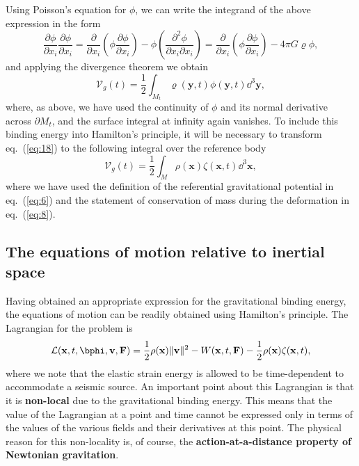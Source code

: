 Using Poisson's equation for $\phi$, we can write the integrand of the above expression in the form
\begin{equation}
\frac{\partial\phi}{\partial x_{i}}\frac{\partial\phi}{\partial x_{i}}=\frac{\partial}{\partial x_{i}}
\left(\phi\frac{\partial\phi}{\partial x_{i}}\right)-\phi\left(\frac{\partial^{2}\phi}{\partial x_{i}
\partial x_{i}}\right)=\frac{\partial}{\partial x_{i}}\left(\phi\frac{\partial\phi}{\partial x_{i}}\right)-4\pi G\varrho\phi,
\label{eq:17}
\end{equation}
and applying the divergence theorem we obtain
\begin{equation}
\mathcal{V}_{g}(t)=\frac{1}{2}\int_{M_{t}}\varrho(\mathbf{y},t)\phi(\mathbf{y},t)\dd^{3}\mathbf{y},
\label{eq:18}
\end{equation}
where, as above, we have used the continuity of $\phi$ and its normal derivative across $\partial M_{t}$, 
and the surface integral at infinity again vanishes. To include this binding energy into Hamilton's principle, 
it will be necessary to transform eq.~(\ref{eq:18}) to the following integral over the reference body
\begin{equation}
\mathcal{V}_{g}(t)=\frac{1}{2}\int_{M}\rho(\mathbf{x})\zeta(\mathbf{x},t)\dd^{3}\mathbf{x},
\label{eq:19}
\end{equation}
where we have used the definition of the referential gravitational potential in eq.~(\ref{eq:6}) and the statement of 
conservation of mass during the deformation in eq.~(\ref{eq:8}).

\subsection*{The equations of motion relative to inertial space}

Having obtained an appropriate expression for the gravitational binding energy, the equations of motion can 
be readily obtained using Hamilton's principle. The Lagrangian for the problem is
\begin{equation}
\mathcal{L}(\mathbf{x},t,\bphi,\mathbf{v},\mathbf{F})=\frac{1}{2}\rho(\mathbf{x})\|\mathbf{v}\|^{2}
-W(\mathbf{x},t,\mathbf{F})-\frac{1}{2}\rho(\mathbf{x})\zeta(\mathbf{x},t),
\label{eq:20}
\end{equation}
where we note that the elastic strain energy is allowed to be time-dependent to accommodate a seismic source. 
An important point about this Lagrangian is that it is \textbf{non-local} due to the gravitational binding energy. This 
means that the value of the Lagrangian at a point and time cannot be expressed only in terms of the values of 
the various fields and their derivatives at this point. The physical reason for this non-locality is, of course, 
the \textbf{action-at-a-distance property of Newtonian gravitation}. 

